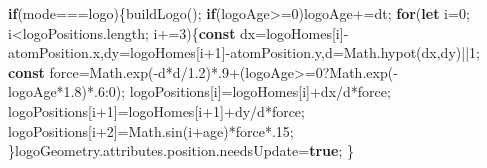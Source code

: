 \documentclass[
  canadien,
  11pt,
  letterpaper,
]{article}
\newenvironment{Shaded}{}{}
\newcommand{\AttributeTok}[1]{\textcolor[rgb]{0.49,0.56,0.16}{#1}}
\newcommand{\BuiltInTok}[1]{\textcolor[rgb]{0.00,0.50,0.00}{#1}}
\newcommand{\ControlFlowTok}[1]{\textcolor[rgb]{0.00,0.44,0.13}{\textbf{#1}}}
\newcommand{\DecValTok}[1]{\textcolor[rgb]{0.25,0.63,0.44}{#1}}
\newcommand{\FloatTok}[1]{\textcolor[rgb]{0.25,0.63,0.44}{#1}}
\newcommand{\FunctionTok}[1]{\textcolor[rgb]{0.02,0.16,0.49}{#1}}
\newcommand{\KeywordTok}[1]{\textcolor[rgb]{0.00,0.44,0.13}{\textbf{#1}}}
\newcommand{\NormalTok}[1]{#1}
\newcommand{\OperatorTok}[1]{\textcolor[rgb]{0.40,0.40,0.40}{#1}}
\newcommand{\StringTok}[1]{\textcolor[rgb]{0.25,0.44,0.63}{#1}}
\begin{document}
\begin{Shaded}
\begin{Highlighting}[]
\ControlFlowTok{if}\NormalTok{(mode}\OperatorTok{===}\StringTok{\textquotesingle{}logo\textquotesingle{}}\NormalTok{)\{}\FunctionTok{buildLogo}\NormalTok{()}\OperatorTok{;}
\ControlFlowTok{if}\NormalTok{(logoAge}\OperatorTok{\textgreater{}=}\DecValTok{0}\NormalTok{)logoAge}\OperatorTok{+=}\NormalTok{dt}\OperatorTok{;}
\ControlFlowTok{for}\NormalTok{(}\KeywordTok{let}\NormalTok{ i}\OperatorTok{=}\DecValTok{0}\OperatorTok{;}
\NormalTok{i}\OperatorTok{\textless{}}\NormalTok{logoPositions}\OperatorTok{.}\AttributeTok{length}\OperatorTok{;}
\NormalTok{i}\OperatorTok{+=}\DecValTok{3}\NormalTok{)\{}\KeywordTok{const}\NormalTok{ dx}\OperatorTok{=}\NormalTok{logoHomes[i]}\OperatorTok{{-}}\NormalTok{atomPosition}\OperatorTok{.}\AttributeTok{x}\OperatorTok{,}\NormalTok{dy}\OperatorTok{=}\NormalTok{logoHomes[i}\OperatorTok{+}\DecValTok{1}\NormalTok{]}\OperatorTok{{-}}\NormalTok{atomPosition}\OperatorTok{.}\AttributeTok{y}\OperatorTok{,}\NormalTok{d}\OperatorTok{=}\BuiltInTok{Math}\OperatorTok{.}\FunctionTok{hypot}\NormalTok{(dx}\OperatorTok{,}\NormalTok{dy)}\OperatorTok{||}\DecValTok{1}\OperatorTok{;}
\KeywordTok{const}\NormalTok{ force}\OperatorTok{=}\BuiltInTok{Math}\OperatorTok{.}\FunctionTok{exp}\NormalTok{(}\OperatorTok{{-}}\NormalTok{d}\OperatorTok{*}\NormalTok{d}\OperatorTok{/}\FloatTok{1.2}\NormalTok{)}\OperatorTok{*.}\DecValTok{9}\OperatorTok{+}\NormalTok{(logoAge}\OperatorTok{\textgreater{}=}\DecValTok{0}\OperatorTok{?}\BuiltInTok{Math}\OperatorTok{.}\FunctionTok{exp}\NormalTok{(}\OperatorTok{{-}}\NormalTok{logoAge}\OperatorTok{*}\FloatTok{1.8}\NormalTok{)}\OperatorTok{*.}\DecValTok{6}\OperatorTok{:}\DecValTok{0}\NormalTok{)}\OperatorTok{;}
\NormalTok{logoPositions[i]}\OperatorTok{=}\NormalTok{logoHomes[i]}\OperatorTok{+}\NormalTok{dx}\OperatorTok{/}\NormalTok{d}\OperatorTok{*}\NormalTok{force}\OperatorTok{;}
\NormalTok{logoPositions[i}\OperatorTok{+}\DecValTok{1}\NormalTok{]}\OperatorTok{=}\NormalTok{logoHomes[i}\OperatorTok{+}\DecValTok{1}\NormalTok{]}\OperatorTok{+}\NormalTok{dy}\OperatorTok{/}\NormalTok{d}\OperatorTok{*}\NormalTok{force}\OperatorTok{;}
\NormalTok{logoPositions[i}\OperatorTok{+}\DecValTok{2}\NormalTok{]}\OperatorTok{=}\BuiltInTok{Math}\OperatorTok{.}\FunctionTok{sin}\NormalTok{(i}\OperatorTok{+}\NormalTok{age)}\OperatorTok{*}\NormalTok{force}\OperatorTok{*.}\DecValTok{15}\OperatorTok{;}
\NormalTok{\}logoGeometry}\OperatorTok{.}\AttributeTok{attributes}\OperatorTok{.}\AttributeTok{position}\OperatorTok{.}\AttributeTok{needsUpdate}\OperatorTok{=}\KeywordTok{true}\OperatorTok{;}
\NormalTok{\}}
\end{Highlighting}
\end{Shaded}
\end{document}
